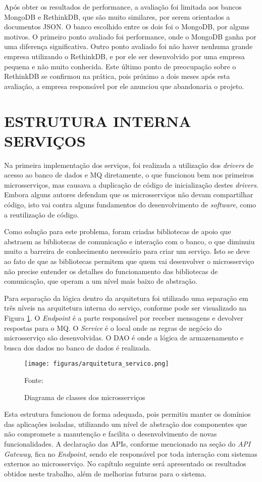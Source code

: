 Após obter os resultados de performance, a avaliação foi limitada aos bancos
MongoDB e RethinkDB, que são muito similares, por serem orientados a
documentos \ac{JSON}. O banco escolhido entre os dois foi o MongoDB, por
alguns motivos. O primeiro ponto avaliado foi performance, onde o MongoDB
ganha por uma diferença significativa. Outro ponto avaliado foi não haver
nenhuma grande empresa utilizando o RethinkDB, e por ele ser desenvolvido
por uma empresa pequena e não muito conhecida. Este último ponto de
preocupação sobre o RethinkDB se confirmou na prática, pois próximo a dois
meses após esta avaliação, a empresa responsável por ele anunciou que
abandonaria o projeto.

\section{ESTRUTURA INTERNA SERVIÇOS}

Na primeira implementação dos serviços, foi realizada a utilização dos
\emph{drivers} de acesso ao banco de dados e \ac{MQ} diretamente, o que
funcionou bem nos primeiros microsserviços, mas causava a duplicação de código de
inicialização destes \emph{drivers}. Embora alguns autores defendam que
os microsserviços não devam compartilhar código, isto vai contra alguns
fundamentos do desenvolvimento de \emph{software}, como a reutilização de código.

Como solução para este problema, foram criadas bibliotecas de apoio que
abstraem as bibliotecas de comunicação e interação com o banco, o que
diminuiu muito a barreira de conhecimento necessário para criar um serviço.
Isto se deve ao fato de que as bibliotecas permitem que quem vai desenvolver
o microsserviço não precise entender os detalhes do funcionamento das
bibliotecas de comunicação, que operam a um nível mais baixo de abstração.

Para separação da lógica dentro da arquitetura foi utilizado uma separação
em três níveis na arquitetura interna do serviço, conforme pode ser visualizado
na Figura \ref{fig:arch-servico}. O \emph{Endpoint} é a parte responsável
por receber mensagens e devolver respostas para o \ac{MQ}. O \emph{Service}
é o local onde as regras de negócio do microsserviço são desenvolvidas. O
\ac{DAO} é onde a lógica de armazenamento e busca dos dados no banco de
dados é realizada.

\begin{figure}[H]
	\centering
	\caption{Diagrama de classes dos microsserviços}
	\texttt{[image: figuras/arquitetura\_servico.png]}

	\label{fig:arch-servico}
	\footnotesize Fonte: \fonteOAutor
\end{figure}

Esta estrutura funcionou de forma adequada, pois permitiu manter os domínios
das aplicações isoladas, utilizando um nível de abstração dos componentes
que não compromete a manutenção e facilita o desenvolvimento de novas
funcionalidades. A declaração das \acp{API}, conforme mencionado na seção
do \emph{API Gateway}, fica no \emph{Endpoint}, sendo ele responsável
por toda interação com sistemas externos ao microsserviço. No capítulo
seguinte será apresentado os resultados obtidos neste trabalho, além de
melhorias futuras para o sistema.
